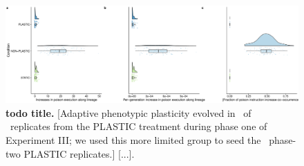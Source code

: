 \begin{figure}[h!]
    \centering
    \includegraphics[width=1.0\textwidth]{media/poison-accumulation-panel.pdf}
    \caption{\small
    \textbf{todo title.}
    [Adaptive phenotypic plasticity evolved in \deleteriousHitchhikingPlasticReps\ of \deleteriousHitchhikingReplicates\ replicates from the PLASTIC treatment during phase one of Experiment III; we used this more limited group to seed the \deleteriousHitchhikingPlasticReps\ phase-two PLASTIC replicates.] [...].
    }
    \label{fig:deleterious-hitchhiking}
\end{figure}